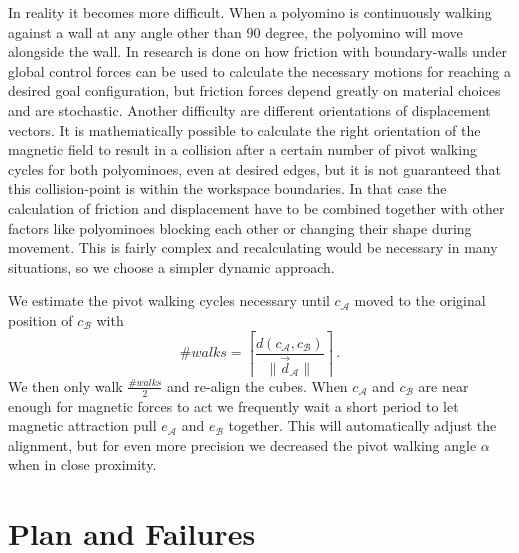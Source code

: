 In reality it becomes more difficult.
When a polyomino is continuously walking against a wall at any angle other than 90 degree, the polyomino will move alongside the wall.
In \cite{schmidt2020} research is done on how friction with boundary-walls under global control forces can be used to calculate the necessary motions for reaching a desired goal configuration, but friction forces depend greatly on material choices and are stochastic.
Another difficulty are different orientations of displacement vectors.
It is mathematically possible to calculate the right orientation of the magnetic field to result in a collision after a certain number of pivot walking cycles for both polyominoes, even at desired edges, but it is not guaranteed that this collision-point is within the workspace boundaries.
In that case the calculation of friction and displacement have to be combined together with other factors like polyominoes blocking each other or changing their shape during movement.
This is fairly complex and recalculating would be necessary in many situations, so we choose a simpler dynamic approach.

We estimate the pivot walking cycles necessary until $c_\mathcal{A}$ moved to the original position of $c_\mathcal{B}$ with
\begin{equation}
\#\textit{walks} = \left\lceil \frac{d(c_\mathcal{A}, c_\mathcal{B})}{\lVert \vec{d}_\mathcal{A} \rVert} \right\rceil \,.
\end{equation}
We then only walk $\frac{\#\textit{walks}}{2}$ and re-align the cubes.
When $c_\mathcal{A}$ and $c_\mathcal{B}$ are near enough for magnetic forces to act we frequently wait a short period to let magnetic attraction pull $e_\mathcal{A}$ and $e_\mathcal{B}$ together.
This will automatically adjust the alignment, but for even more precision we decreased the pivot walking angle $\alpha$ when in close proximity.

\section{Plan and Failures}
\label{sec:plan}

